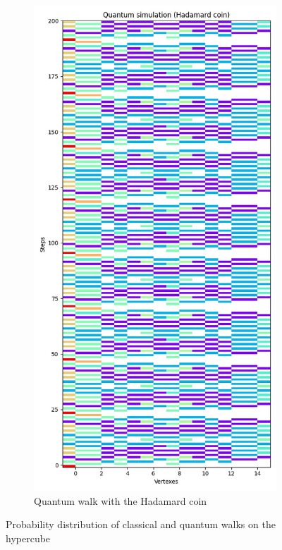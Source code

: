 \begin{figure}[H]
\begin{subfigure}{.45\linewidth}
  \end{subfigure}
  \begin{subfigure}{.45\linewidth}
    \centering
    \includegraphics[width=\linewidth]{./figures/results/hypercube/hadamard.jpg}
    \caption{Quantum walk with the Hadamard coin}
  \end{subfigure}
  \caption{Probability distribution of classical and quantum walks on the hypercube}
\end{figure}

